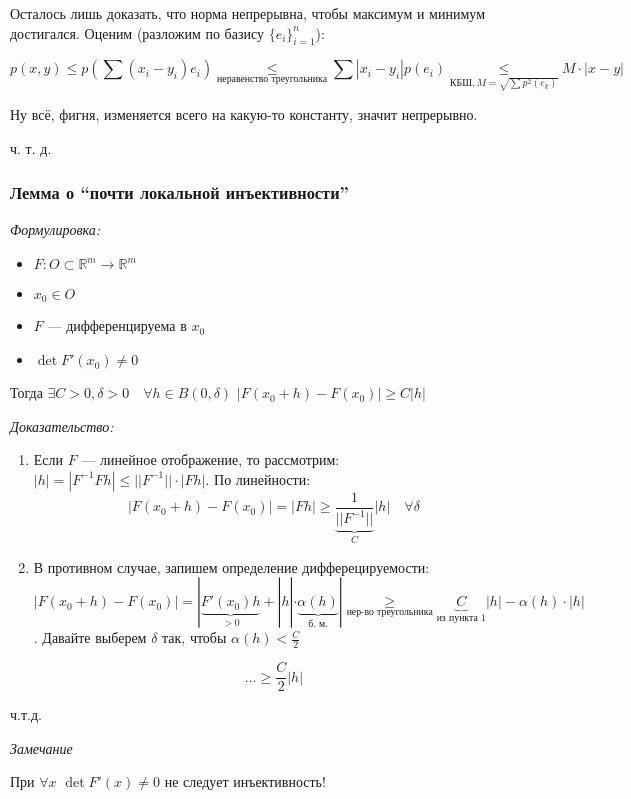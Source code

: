 \documentclass{article}
\def\dbl{\,\,}
\begin{document}
Осталось лишь доказать, что норма непрерывна, чтобы максимум и минимум достигался. Оценим (разложим по базису $\{e_i\}_{i = 1}^{n}$):

\[p(x, y) \le p\left(\sum (x_i - y_i)e_i\right) \underset{\text{неравенство треугольника}}{\le} \sum|x_i - y_i|p(e_i) \underset{\text{КБШ}, M = \sqrt{\sum p^2(e_k)}}{\le} M \cdot |x - y|\]

Ну всё, фигня, изменяется всего на какую-то константу, значит непрерывно.

ч. т. д.

\subsubsection{Лемма о ``почти локальной инъективности''}
\textit{Формулировка:}

\begin{itemize}
    \item $F: O \subset \mathbb{R}^m \rightarrow \mathbb{R}^m$
    \item $x_0 \in O$
    \item $F$ --- дифференцируема в $x_0$
    \item $\det F'(x_0) \neq 0 $
\end{itemize}

Тогда $\exists C > 0, \delta > 0 \quad \forall h \in B(0, \delta) \dbl |F(x_0 + h) - F(x_0)| \ge C|h|$

\textit{Доказательство:}

\begin{enumerate}
    \item Если $F$ --- линейное отображение, то рассмотрим: $|h| = |F^{-1}Fh| \le ||F^{-1}|| \cdot |Fh|$. По линейности: 
    \[|F(x_0 + h) - F(x_0)| = |Fh| \ge \underbrace{\frac{1}{||F^{-1}||}}_{C}|h| \quad \forall \delta\]
    \item В противном случае, запишем определение дифферецируемости: $|F(x_0 + h) - F(x_0)| = |\underbrace{F'(x_0)h}_{> 0} + |h| \cdot \underbrace{\alpha(h)}_{\text{б. м.}}| \underset{\text{нер-во треугольника}}{\ge} \underbrace{C}_{\text{из пункта 1}}|h| - \alpha(h) \cdot |h|$. Давайте выберем $\delta$ так, чтобы $\alpha(h) < \frac{C}{2}$
    
    \[\ldots\ge \frac{C}{2}|h|\]
\end{enumerate}

ч.т.д.

\textit{Замечание}

При $\forall x \dbl \det F'(x) \neq 0$ не следует инъективность!
\end{document}
